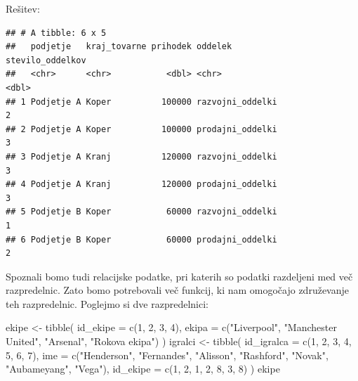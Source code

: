 \documentclass[
]{book}
\newenvironment{Shaded}{\begin{snugshade}}{\end{snugshade}}
\newcommand{\AttributeTok}[1]{\textcolor[rgb]{0.77,0.63,0.00}{#1}}
\newcommand{\DecValTok}[1]{\textcolor[rgb]{0.00,0.00,0.81}{#1}}
\newcommand{\FunctionTok}[1]{\textcolor[rgb]{0.00,0.00,0.00}{#1}}
\newcommand{\NormalTok}[1]{#1}
\newcommand{\OtherTok}[1]{\textcolor[rgb]{0.56,0.35,0.01}{#1}}
\newcommand{\StringTok}[1]{\textcolor[rgb]{0.31,0.60,0.02}{#1}}
\begin{document}
Rešitev:

\begin{verbatim}
## # A tibble: 6 x 5
##   podjetje   kraj_tovarne prihodek oddelek          stevilo_oddelkov
##   <chr>      <chr>           <dbl> <chr>                       <dbl>
## 1 Podjetje A Koper          100000 razvojni_oddelki                2
## 2 Podjetje A Koper          100000 prodajni_oddelki                3
## 3 Podjetje A Kranj          120000 razvojni_oddelki                3
## 4 Podjetje A Kranj          120000 prodajni_oddelki                3
## 5 Podjetje B Koper           60000 razvojni_oddelki                1
## 6 Podjetje B Koper           60000 prodajni_oddelki                2
\end{verbatim}

Spoznali bomo tudi relacijske podatke, pri katerih so podatki razdeljeni med več razpredelnic. Zato bomo potrebovali več funkcij, ki nam omogočajo združevanje teh razpredelnic. Poglejmo si dve razpredelnici:

\begin{Shaded}
\begin{Highlighting}[]
\NormalTok{ekipe }\OtherTok{\textless{}{-}} \FunctionTok{tibble}\NormalTok{(}
  \AttributeTok{id\_ekipe =} \FunctionTok{c}\NormalTok{(}\DecValTok{1}\NormalTok{, }\DecValTok{2}\NormalTok{, }\DecValTok{3}\NormalTok{, }\DecValTok{4}\NormalTok{),}
  \AttributeTok{ekipa =} \FunctionTok{c}\NormalTok{(}\StringTok{"Liverpool"}\NormalTok{, }\StringTok{"Manchester United"}\NormalTok{, }\StringTok{"Arsenal"}\NormalTok{, }\StringTok{"Rokova ekipa"}\NormalTok{)}
\NormalTok{)}
\NormalTok{igralci }\OtherTok{\textless{}{-}} \FunctionTok{tibble}\NormalTok{(}
  \AttributeTok{id\_igralca =} \FunctionTok{c}\NormalTok{(}\DecValTok{1}\NormalTok{, }\DecValTok{2}\NormalTok{, }\DecValTok{3}\NormalTok{, }\DecValTok{4}\NormalTok{, }\DecValTok{5}\NormalTok{, }\DecValTok{6}\NormalTok{, }\DecValTok{7}\NormalTok{),}
  \AttributeTok{ime =} \FunctionTok{c}\NormalTok{(}\StringTok{"Henderson"}\NormalTok{, }\StringTok{"Fernandes"}\NormalTok{, }\StringTok{"Alisson"}\NormalTok{, }\StringTok{"Rashford"}\NormalTok{, }\StringTok{"Novak"}\NormalTok{, }\StringTok{"Aubameyang"}\NormalTok{, }\StringTok{"Vega"}\NormalTok{),}
  \AttributeTok{id\_ekipe =} \FunctionTok{c}\NormalTok{(}\DecValTok{1}\NormalTok{, }\DecValTok{2}\NormalTok{, }\DecValTok{1}\NormalTok{, }\DecValTok{2}\NormalTok{, }\DecValTok{8}\NormalTok{, }\DecValTok{3}\NormalTok{, }\DecValTok{8}\NormalTok{)}
\NormalTok{)}
\NormalTok{ekipe}
\end{Highlighting}
\end{Shaded}
\end{document}
